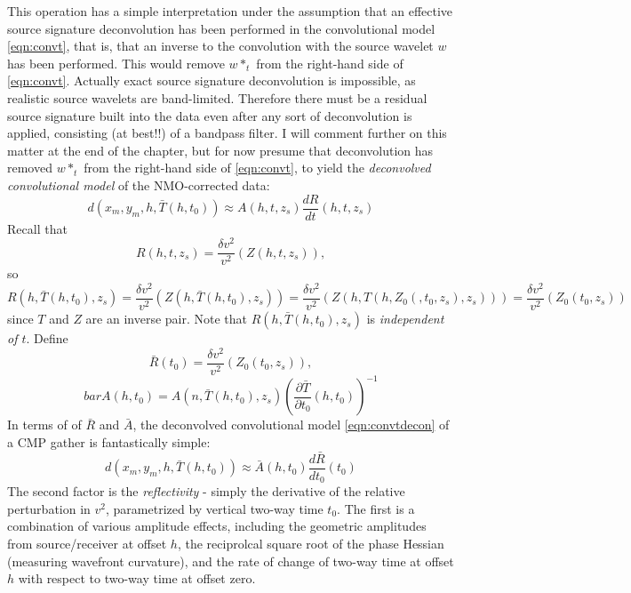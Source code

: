 This operation has a simple interpretation under the assumption that an effective source signature deconvolution has been performed in the convolutional model \ref{eqn:convt}, that is, that an inverse to the convolution with the source wavelet $w$ has been performed. This would remove $w*_t$ from the right-hand side of \ref{eqn:convt}. Actually exact source signature deconvolution is impossible, as realistic source wavelets are band-limited. Therefore there must be a residual source signature built into the data even after any sort of deconvolution is applied, consisting (at best!!) of a bandpass filter. I will comment further on this matter at the end of the chapter, but for now presume that deconvolution has removed $w*_t$ from the right-hand side of \ref{eqn:convt}, to yield the {\em deconvolved convolutional model} of the NMO-corrected data:
\begin{equation}
\label{eqn:convtdecon}
d(x_m,y_m,h,\bar{T}(h,t_0))  \approx  A(h,t,z_s) \frac{dR}{dt}(h,t,z_s)
\end{equation}
Recall that
\[
R(h,t,z_s) = \frac{\delta v^2}{v^2}(Z(h,t,z_s)) ,
\]
so 
\[
R(h,\bar{T}(h,t_0),z_s) = \frac{\delta v^2}{v^2}(Z(h,\bar{T}(h,t_0),z_s))
=\frac{\delta v^2}{v^2}(Z(h,T(h,Z_0(,t_0,z_s),z_s))) = \frac{\delta v^2}{v^2}(Z_0(t_0,z_s))
\]
since $T$ and $Z$ are an inverse pair. Note that $R(h,\bar{T}(h,t_0),z_s)$ is {\em independent of $t$}. Define \begin{equation}
\label{eqn:refldef}
\bar{R}(t_0) = \frac{\delta v^2}{v^2}(Z_0(t_0,z_s)),
\end{equation}
\begin{equation}
\label{eqn:ampdef}
 bar{A}(h,t_0) = A(n,\bar{T}(h,t_0),z_s)\left(\frac{\partial \bar{T}}{\partial t_0}(h,t_0)\right)^{-1}
\end{equation}
In terms of of $\bar{R}$ and $\bar{A}$, the deconvolved convolutional model \ref{eqn:convtdecon} of a CMP gather is
fantastically simple:
\begin{equation}
\label{eqn:convt0}
d(x_m,y_m,h,\bar{T}(h,t_0)) \approx \bar{A}(h,t_0) \frac{d\bar{R}}{dt_0}(t_0) 
\end{equation}
The second factor is the {\em reflectivity} - simply the derivative of the relative perturbation in $v^2$, parametrized by vertical two-way time $t_0$. The first is a combination of various amplitude effects, including the geometric amplitudes from source/receiver at offset $h$, the reciprolcal square root of the phase Hessian (measuring wavefront curvature), and the rate of change of two-way time at offset $h$ with respect to two-way time at offset zero.

